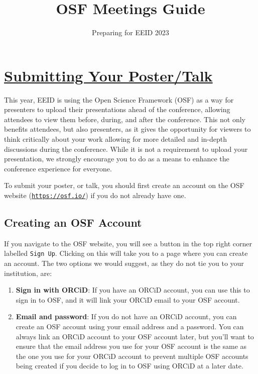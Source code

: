 \documentclass{scrartcl}
\begin{document}
\title{\vspace{-1cm}\textbf{OSF Meetings Guide}}
\subtitle{Preparing for EEID 2023}
\maketitle

\vspace*{-1cm}

\section{\underline{Submitting Your Poster/Talk}}

This year, EEID is using the Open Science Framework (OSF) as a way for presenters to upload their presentations ahead of the conference, allowing attendees to view them before, during, and after the conference.
This not only benefits attendees, but also presenters, as it gives the opportunity for viewers to think critically about your work allowing for more detailed and in-depth discussions during the conference.
While it is not a requirement to upload your presentation, we strongly encourage you to do as a means to enhance the conference experience for everyone.


To submit your poster, or talk, you should first create an account on the OSF website (\href{https://osf.io/}{\texttt{https://osf.io/}}) if you do not already have one.

\subsection{Creating an OSF Account}

If you navigate to the OSF website, you will see a button in the top right corner labelled \texttt{Sign Up}.
Clicking on this will take you to a page where you can create an account.
The two options we would suggest, as they do not tie you to your institution, are:

\begin{enumerate}
    \item \textbf{Sign in with ORCiD}: If you have an ORCiD account, you can use this to sign in to OSF, and it will link your ORCiD email to your OSF account.
    \item \textbf{Email and password}: If you do not have an ORCiD account, you can create an OSF account using your email address and a password.
    You can always link an ORCiD account to your OSF account later, but you'll want to ensure that the email address you use for your OSF account is the same as the one you use for your ORCiD account to prevent multiple OSF accounts being created if you decide to log in to OSF using ORCiD at a later date.
\end{enumerate}
\end{document}
